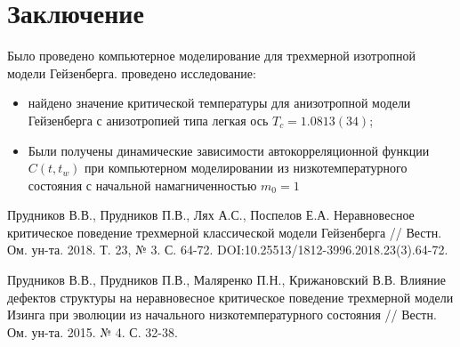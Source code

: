 \documentclass[a4paper,14pt]{extarticle}
\begin{document}
\newpage
\section*{Заключение}


Было проведено компьютерное моделирование для трехмерной изотропной модели Гейзенберга. проведено исследование:

\begin{itemize}
\item найдено значение критической температуры для анизотропной модели Гейзенберга с анизотропией типа легкая ось $T_c=1.0813(34)$;

\item Были получены динамические зависимости автокорреляционной функции $C(t,t_w)$ при компьютерном моделировании из низкотемпературного состояния с начальной намагниченностью $m_0 = 1$
\end{itemize}
\newpage
\begin{thebibliography}{99} 

Прудников В.В., Прудников П.В., Лях А.С., Поспелов Е.А. Неравновесное критическое поведение трехмерной классической модели Гейзенберга // Вестн. Ом. ун-та. 2018. Т. 23, № 3. С. 64-72. DOI:10.25513/1812-3996.2018.23(3).64-72. 

Прудников В.В., Прудников П.В., Маляренко П.Н., Крижановский В.В. Влияние дефектов структуры на неравновесное критическое поведение трехмерной модели Изинга при эволюции из начального низкотемпературного состояния // Вестн. Ом. ун-та. 2015. № 4. С. 32-38. 


\end{thebibliography}
\end{document}
